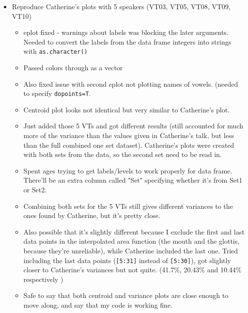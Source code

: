 \documentclass{article}
\begin{document}
\begin{itemize}
    \item Reproduce Catherine's plots with 5 speakers (VT03, VT05, VT08, VT09, VT10)
    \begin{itemize}
        \item eplot fixed - warnings about labels was blocking the later arguments. Needed to convert the labels from the data frame integers into strings with \verb|as.character()|
        \item Passed colors through as a vector
        \item Also fixed issue with second eplot not plotting names of vowels. (needed to specify \verb|dopoints=T|.
        \item Centroid plot looks not identical but very similar to Catherine's plot.
        \item Just added those 5 VTs and got different results (still accounted for much more of the variance than the values given in Catherine's talk, but less than the full combined one set dataset). Catherine's plots were created with both sets from the data, so the second set need to be read in.
        \item Spent ages trying to get labels/levels to work properly for data frame. There'll be an extra column called "Set" specifying whether it's from Set1 or Set2.
        \item Combining both sets for the 5 VTs still gives different variances to the ones found by Catherine, but it's pretty close.
        \item Also possible that it's slightly different because I exclude the first and last data points in the interpolated area function (the mouth and the glottis, because they're unreliable), while Catherine included the last one. Tried including the last data points (\verb|[5:31]| instead of \verb|[5:30]|), got slightly closer to Catherine's variances but not quite. (41.7\%, 20.43\% and 10.44\% respectively )
        \item Safe to say that both centroid and variance plots are close enough to move along, and say that my code is working fine.
    \end{itemize}
\end{itemize}
\end{document}
